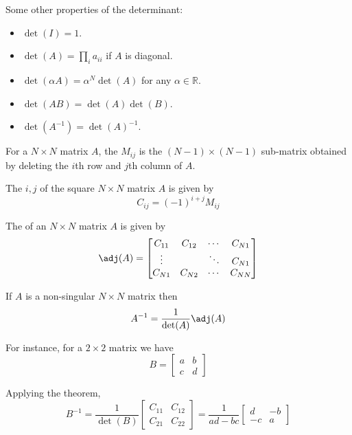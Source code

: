 \documentclass{article}
\begin{document}
Some other properties of the determinant:
\begin{itemize}[label=$\bullet$]
  \item $\det(I) = 1$.
  \item $\det(A) = \prod_{i} a_{ii}$ if $A$ is diagonal.
  \item $\det(\alpha A) = \alpha^N \det(A)$ for any $\alpha \in \mathbb{R}$.
  \item $\det(AB) = \det(A) \det(B)$.
  \item $\det(A^{-1}) = \det(A)^{-1}$.
\end{itemize}

\begin{definition}
  For a $N \times N$ matrix $A$, the $M_{ij}$  is the $(N - 1) \times (N - 1)$ sub-matrix obtained by deleting the $i$th row and $j$th column of $A$.
\end{definition}

\begin{definition}
  The $i, j$  of the square $N \times N$ matrix $A$ is given by
  \[
    C_{ij} = (-1)^{i + j} M_{ij}
  \]
\end{definition}

\begin{definition}
  The  of an $N \times N$ matrix $A$ is given by
  \[
    \adj(A) = \left[\begin{matrix}
        C_{11} & C_{12} & \cdots & C_{N1} \\
        \vdots &        & \ddots & C_{N1} \\
        C_{N1} & C_{N2} & \cdots & C_{NN}
    \end{matrix}\right]
  \]
\end{definition}

\begin{theorem}
  If $A$ is a non-singular $N \times N$ matrix then
  \[
    A^{-1} = \dfrac{1}{\det(A)} \adj(A)
  \]
\end{theorem}

For instance, for a $2 \times 2$ matrix we have
\[
  B = \left[\begin{matrix}
      a & b \\ c & d
  \end{matrix}\right]
\]

Applying the theorem,
\[
  B^{-1}
  =
  \dfrac{1}{\det(B)}
  \left[\begin{matrix}
      C_{11} & C_{12} \\
      C_{21} & C_{22}
  \end{matrix}\right]
  =
  \dfrac{1}{ad - bc}
  \left[\begin{matrix}
      d & -b \\ -c & a
  \end{matrix}\right]
\]
\end{document}
